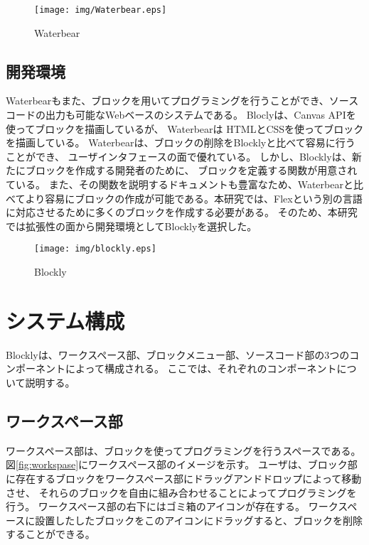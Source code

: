 \documentclass{risepaper}
\begin{document}
\begin{figure}[h]
\begin{center}
\texttt{[image: img/Waterbear.eps]}
\caption{Waterbear}%
\label{fig:Waterbear}
\end{center}%
\end{figure}%

\subsection{開発環境}

Waterbearもまた、ブロックを用いてプログラミングを行うことができ、ソースコードの出力も可能なWebベースのシステムである。
Bloclyは、Canvas APIを使ってブロックを描画しているが、
Waterbearは HTMLとCSSを使ってブロックを描画している。
Waterbearは、ブロックの削除をBlocklyと比べて容易に行うことができ、
ユーザインタフェースの面で優れている。
しかし、Blocklyは、新たにブロックを作成する開発者のために、
ブロックを定義する関数が用意されている。
また、その関数を説明するドキュメントも豊富なため、Waterbearと比べてより容易にブロックの作成が可能である。本研究では、Flexという別の言語に対応させるために多くのブロックを作成する必要がある。
そのため、本研究では拡張性の面から開発環境としてBlocklyを選択した。

\begin{figure}[h]
\begin{center}
\texttt{[image: img/blockly.eps]}
\caption{Blockly}%
\label{fig:Blockly}
\end{center}%
\end{figure}%

\section{システム構成}

Blocklyは、ワークスペース部、ブロックメニュー部、ソースコード部の3つのコンポーネントによって構成される。
ここでは、それぞれのコンポーネントについて説明する。

\subsection{ワークスペース部}

ワークスペース部は、ブロックを使ってプログラミングを行うスペースである。
図\ref{fig:workspase}にワークスペース部のイメージを示す。
ユーザは、ブロック部に存在するブロックをワークスペース部にドラッグアンドドロップによって移動させ、
それらのブロックを自由に組み合わせることによってプログラミングを行う。
ワークスペース部の右下にはゴミ箱のアイコンが存在する。
ワークスペースに設置したしたブロックをこのアイコンにドラッグすると、ブロックを削除することができる。
\end{document}
